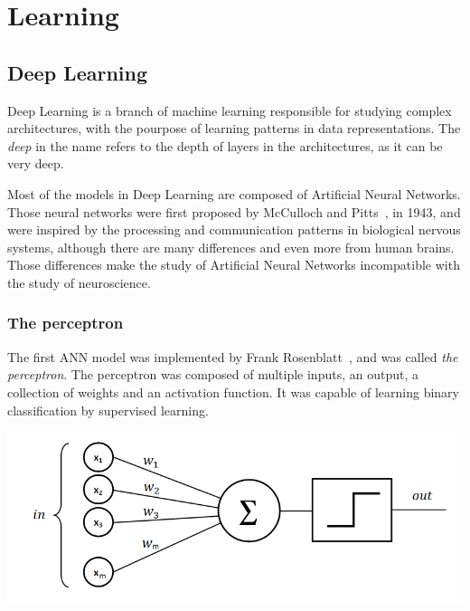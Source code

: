 \newpage

\chapter{Learning}
\label{chap:learning}

\section{Deep Learning}
\label{sec:deep-learning}

Deep Learning is a branch of machine learning responsible for studying complex architectures, with the pourpose of learning patterns in data representations. The \textit{deep} in the name refers to the depth of layers in the architectures, as it can be very deep.

Most of the models in Deep Learning are composed of Artificial Neural Networks. Those neural networks were first proposed by McCulloch and Pitts~\cite{McCulloch1943}, in 1943, and were inspired by the processing and communication patterns in biological nervous systems, although there are many differences and even more from human brains. Those differences make the study of Artificial Neural Networks incompatible with the study of neuroscience.

\subsection{The perceptron}
The first ANN model was implemented by Frank Rosenblatt~\cite{Rosenblatt1958}, and was called \textit{the perceptron}. The perceptron was composed of multiple inputs, an output, a collection of weights and an activation function. It was capable of learning binary classification by supervised learning.

\begin{center}
\includegraphics[width=1\columnwidth]{perceptron}
\end{center}

